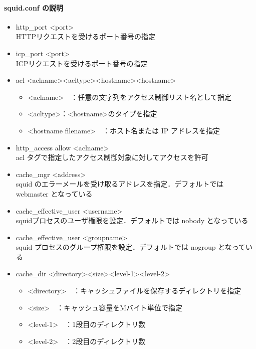 
\paragraph{squid.conf の説明}
\begin{itemize}
\item http\_port \textless port\textgreater \ \\
HTTPリクエストを受けるポート番号の指定
\item icp\_port \textless port\textgreater \ \\
ICPリクエストを受けるポート番号の指定
\item acl \textless aclname\textgreater \textless acltype\textgreater \textless hostname\textgreater \textless hostname\textgreater
    \begin{itemize}
    \item \textless aclname\textgreater　：任意の文字列をアクセス制御リスト名として指定
    \item \textless acltype\textgreater  ：\textless hostname\textgreater のタイプを指定
    \item \textless hostname \textbar  filename\textgreater　：ホスト名または IP アドレスを指定
    \end{itemize}
\item http\_access allow \textless aclname\textgreater \ \\
acl タグで指定したアクセス制御対象に対してアクセスを許可
\item cache\_mgr \textless address\textgreater \ \\
squid のエラーメールを受け取るアドレスを指定．デフォルトでは webmaster となっている
\item cache\_effective\_user \textless username\textgreater \ \\
squidプロセスのユーザ権限を設定．デフォルトでは nobody となっている
\item cache\_effective\_user \textless groupname\textgreater \ \\
squid プロセスのグループ権限を設定．デフォルトでは nogroup となっている
\item cache\_dir \textless directory\textgreater \textless size\textgreater \textless level-1\textgreater \textless level-2\textgreater
    \begin{itemize}
    \item \textless directory\textgreater　：キャッシュファイルを保存するディレクトリを指定
    \item \textless size\textgreater　：キャッシュ容量をMバイト単位で指定
    \item \textless level-1\textgreater 　：1段目のディレクトリ数
    \item \textless level-2\textgreater 　：2段目のディレクトリ数
    \end{itemize}
\end{itemize}

